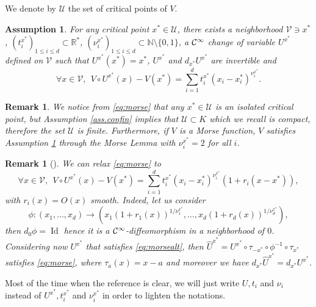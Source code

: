 \documentclass[12pt]{amsart}
\newcommand{\Id}{\operatorname{Id}}
\newcommand{\N}{\mathbb N}
\newcommand{\R}{\mathbb R}
\numberwithin{equation}{section}
\numberwithin{figure}{section}
\newtheorem{remark}[defin]{Remark}
\newtheorem{assumption}{Assumption}
\def\uuu{{\mathcal U}}\def\vvv{{\mathcal V}}\def\www{{\mathcal W}}\def\xxx{{\mathcal X}}
\begin{document}
We denote by $\uuu$ the set of critical points of $V$.
\begin{assumption}\label{ass.morse}
    For any critical point $x^*\in\uuu$, there exists a neighborhood $\vvv\ni x^*$, $(t_i^{x^*})_{1\leq i\leq d}\subset \R^{*}$, $(\nu_i^{x^*})_{1\leq i\leq d}\subset \N\setminus\{0,1\}$, a ${\mathcal C}^\infty$ change %
of variable $U^{x^*}$ defined on $\vvv$ such that $U^{x^*}(x^*)=x^*$, $U^{x^*}$ and $d_{x^*}U^{x^*}$ are invertible and
    \begin{equation}\label{eq:morse}
    \forall x\in\vvv,\ \ V\circ U^{x^*}(x) - V(x^*) = \sum_{i=1}^dt_i^{x^*}(x_i-x_i^*)^{\nu_i^{x^*}}.
    \end{equation}
\end{assumption}
\begin{remark}
    We %
notice from \eqref{eq:morse} that any $x^*\in\uuu$ is an isolated critical point, but Assumption \ref{ass.confin} implies that $\uuu\subset K$ which we %
recall is compact, therefore the set $\uuu$ is finite. Furthermore, if $V$ is a Morse function, $V$ satisfies Assumption \ref{ass.morse} through the Morse Lemma with %
$\nu_i^{x^*} = 2$ for all $i$.
\end{remark}
\begin{remark}[\cite{De25_1}]\label{rem:relax}
    We can relax \eqref{eq:morse} to
    \begin{equation}\label{eq:morsealt}
    \forall x\in\vvv,\ \ V\circ U^{x^*}(x) - V(x^*) = \sum_{i=1}^dt_i^{x^*}(x_i-x_i^*)^{\nu_i^{x^*}}(1+r_i(x-x^*)),
    \end{equation}
    with $r_i(x) = O(x)$ smooth.
    Indeed, let us consider
    \begin{equation*}
    \phi : (x_1,\ldots,x_d)\to(x_1(1+r_1(x))^{1/\nu_1^{x^*}},\ldots,x_d(1+r_d(x))^{1/\nu_d^{x^*}}),
    \end{equation*}
    then $d_{0}\phi = \Id$ hence it is a ${\mathcal C}^\infty$-diffeomorphism in a neighborhood of $0$. Considering now $U^{x^*}$ that satisfies \eqref{eq:morsealt}, then $\hat U^{x^*} = U^{x^*}\circ\tau_{-x^*}\circ\phi^{-1}\circ\tau_{x^*}$ satisfies \eqref{eq:morse}, where $\tau_a(x) = x-a$ and moreover we %
have $d_{x^*}\hat U^{x^*} = d_{x^*}U^{x^*}$.
\end{remark}
Most of the time when the reference is clear, we will just write $U,t_i$ and %
$\nu_i$ instead of $U^{x^*},t_i^{x^*}$ and $\nu_i^{x^*}$ in order to lighten the notations.
\end{document}
